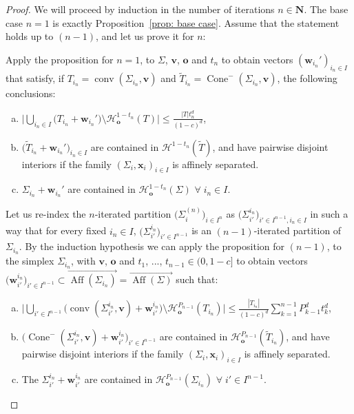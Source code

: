 \documentclass[10pt,a4paper]{amsart}
\newcommand{\N}{\mathbf{N}}
\newcommand{\conv}{\operatorname{conv}}
\newcommand{\ocone}[2]{\operatorname{Cone}^-(#1,#2)}
\begin{document}
\begin{proof}
   We will proceed by induction in the number of iterations $n\in \N$. The base case $n=1$ is exactly Proposition~\ref{prop: base case}. Assume that the statement holds up to $(n-1)$, and let us prove it for $n$:
   
  Apply the proposition for $n=1$, to $\Sigma$, $\mathbf{v}$, $\mathbf{o}$ and $t_n$ to obtain vectors $(\mathbf{w}_{i_n}')_{i_{n}\in I}$ that satisfy, if  $T_{i_n} = \conv(\Sigma_{i_n},\mathbf{v})$ and $\widetilde{T}_{i_n}=\ocone{\Sigma_{i_n}}{ \mathbf{v}}$, the following conclusions:
\begin{enumerate}[(a)]
    \item\label{item:induction11} $\displaystyle \bigg|\bigcup_{i_n\in I} \bigg(T_{i_n}+\mathbf{w}_{i_n}'\bigg)\setminus \mathcal{H}_\mathbf{o}^{1-t_n}(T)\bigg|\leq \frac{|T|t_n^d}{(1-c)^d}$,
    \item\label{item:induction12} $\displaystyle \big(\widetilde{T}_{i_n}+\mathbf{w}_{i_n}'\big)_{i_n\in I}$ are contained in $\mathcal{H}^{1-t_n}(\widetilde{T})$, and have pairwise disjoint interiors if the family $(\Sigma_i,\mathbf{x}_i)_{i \in I}$ is affinely separated.
    \item\label{item:induction13} $\Sigma_{i_n}+\mathbf{w}_{i_n}'$ are contained in $\mathcal{H}^{1-t_n}_\mathbf{o}(\Sigma)$ $\forall \;i_n\in I$.
\end{enumerate} 

Let us re-index the $n$-iterated partition $\big(\Sigma_i^{(n)}\big)_{i \in I^n}$ as $\big(\Sigma_{i'}^{i_n}\big)_{i'\in I^{n-1},i_n \in I}$ in such a way that for every fixed $i_{n}\in I$, $\big(\Sigma_{i'}^{i_n}\big)_{i'\in I^{n-1}}$ is an $(n-1)$-iterated partition of $\Sigma_{i_n}$. By the induction hypothesis we can apply the proposition for $(n-1)$, to the simplex $\Sigma_{i_{n}}$, with $\mathbf{v}$, $\mathbf{o}$ and $t_1$, ..., $t_{n-1}\in (0,1-c]$ to obtain vectors $\big(\mathbf{w}_{i'}^{i_n}\big)_{i'\in I^{n-1}}\subset \overrightarrow{\operatorname{Aff}(\Sigma_{i_n})}=\overrightarrow{\operatorname{Aff}(\Sigma)}$ such that:
\begin{enumerate}[(a),resume]
    \item\label{item:inductionn1} $\displaystyle \bigg|\bigcup_{i'\in I^{n-1}} \bigg(\operatorname{conv}(\Sigma_{i'}^{i_n}, \mathbf{v})+\mathbf{w}_{i'}^{i_n}\bigg)\setminus \mathcal{H}_\mathbf{o}^{P_{n-1}}(T_{i_n})\bigg|\leq \frac{|T_{i_n}|}{(1-c)^d}\sum_{k=1}^{n-1} P_{k-1}^dt_k^d$,
    \item\label{item:inductionn2} $\displaystyle \big(\ocone{\Sigma^{i_n}_{i'}}{ \mathbf{v}}+\mathbf{w}^{i_n}_{i'}\big)_{i'\in I^{n-1}}$ are contained in $\mathcal{H}^{P_{n-1}}_\mathbf{o}(\widetilde{T}_{i_n})$, and have pairwise disjoint interiors if the family $(\Sigma_i,\mathbf{x}_i)_{i \in I}$ is affinely separated.
    \item\label{item:inductionn3} The $\Sigma_{i'}^{i_n}+
    \mathbf{w}^{i_n}_{i'}$ are contained in $\mathcal{H}^{P_{n-1}}_\mathbf{o}(\Sigma_{i_n})$ $\forall \;i'\in I^{n-1}$.
\end{enumerate}


\end{proof}
\end{document}
